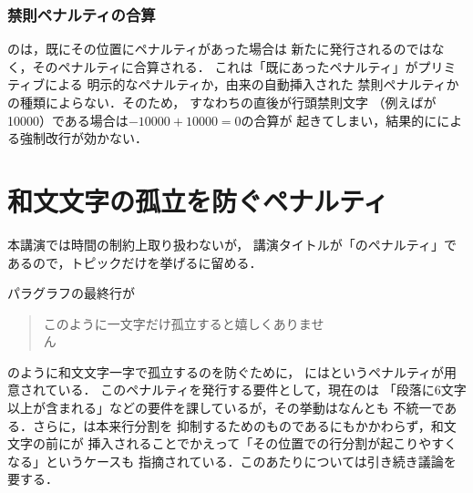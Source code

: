 \documentclass[paper=a4,twocolumn,line_length=24zw,number_of_lines=43]{jlreq}
\begin{document}
\subsubsection{禁則ペナルティの合算}

\pTeX のは，既にその位置にペナルティがあった場合は
新たに発行されるのではなく，そのペナルティに合算される．
これは「既にあったペナルティ」がプリミティブによる
明示的なペナルティか，由来の自動挿入された
禁則ペナルティかの種類によらない．そのため，
すなわちの直後が行頭禁則文字
（例えばが10000）である場合は$-10000+10000=0$の合算が
起きてしまい，結果的にによる強制改行が効かない．

\section{和文文字の孤立を防ぐペナルティ}

本講演では時間の制約上取り扱わないが，
講演タイトルが「\pTeX のペナルティ」であるので，トピックだけを挙げるに留める．

パラグラフの最終行が
\begin{quote}
このように一文字だけ孤立すると嬉しくありませ\\ん
\end{quote}
のように和文文字一字で孤立するのを防ぐために，
\pTeX にはというペナルティが用意されている．
このペナルティを発行する要件として，現在の\pTeX は
「段落に6文字以上が含まれる」などの要件を課しているが，その挙動はなんとも
不統一である\cite{build13}．さらに，は本来行分割を
抑制するためのものであるにもかかわらず，和文文字の前にが
挿入されることでかえって「その位置での行分割が起こりやすくなる」というケースも
指摘されている\cite{qa53892}．このあたりについては引き続き議論を要する．
\end{document}
